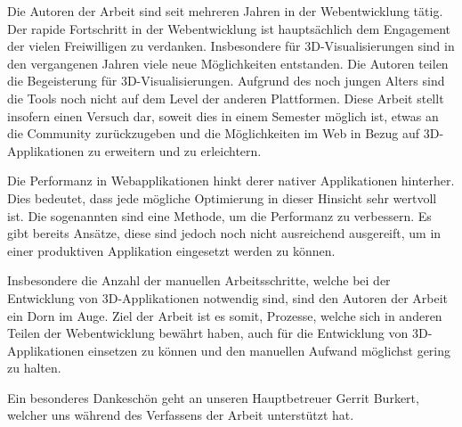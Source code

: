 Die Autoren der Arbeit sind seit mehreren Jahren in der Webentwicklung tätig. Der rapide Fortschritt in der Webentwicklung ist hauptsächlich dem Engagement der vielen Freiwilligen zu verdanken.
Insbesondere für 3D-Visualisierungen sind in den vergangenen Jahren viele neue Möglichkeiten entstanden. Die Autoren teilen die Begeisterung für 3D-Visualisierungen. Aufgrund des noch jungen Alters sind die Tools noch nicht auf dem Level der anderen Plattformen. Diese Arbeit stellt insofern einen Versuch dar, soweit dies in einem Semester möglich ist, etwas an die Community zurückzugeben und die Möglichkeiten im Web in Bezug auf 3D-Applikationen zu erweitern und zu erleichtern.

Die Performanz in Webapplikationen hinkt derer nativer Applikationen hinterher. Dies bedeutet, dass jede mögliche Optimierung in dieser Hinsicht sehr wertvoll ist. Die sogenannten  sind eine Methode, um die Performanz zu verbessern. Es gibt bereits Ansätze, diese sind jedoch noch nicht ausreichend ausgereift, um in einer produktiven Applikation eingesetzt werden zu können.

Insbesondere die Anzahl der manuellen Arbeitsschritte, welche bei der Entwicklung von 3D-Applikationen notwendig sind, sind den Autoren der Arbeit ein Dorn im Auge. Ziel der Arbeit ist es somit, Prozesse, welche sich in anderen Teilen der Webentwicklung bewährt haben, auch für die Entwicklung von 3D-Applikationen einsetzen zu können und den manuellen Aufwand möglichst gering zu halten.

Ein besonderes Dankeschön geht an unseren Hauptbetreuer Gerrit Burkert, welcher uns während des Verfassens der Arbeit unterstützt hat.